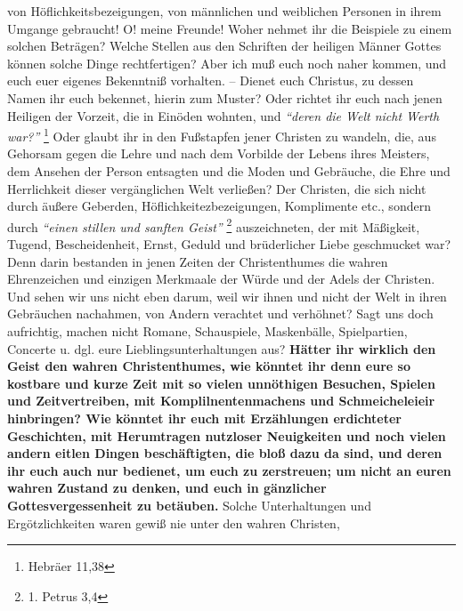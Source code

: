 von Höflichkeitsbezeigungen, von männlichen und weiblichen Personen in ihrem
Umgange gebraucht! O! meine Freunde! Woher nehmet ihr die Beispiele zu einem
solchen Beträgen? Welche Stellen aus den Schriften der heiligen Männer Gottes
können solche Dinge rechtfertigen? Aber ich muß euch noch naher kommen, und euch
euer eigenes Bekenntniß vorhalten. -- Dienet euch Christus, zu dessen Namen ihr
euch bekennet, hierin zum Muster? Oder richtet ihr euch
nach jenen Heiligen der
Vorzeit, die in Einöden wohnten, und
\textit{"`deren die Welt nicht Werth war?"'}
\footnote{Hebräer 11,38}
Oder glaubt ihr in den Fußstapfen jener Christen zu
wandeln, die, aus Gehorsam gegen die Lehre und nach dem Vorbilde der Lebens
ihres Meisters, dem Ansehen der Person entsagten und die Moden und Gebräuche,
die Ehre und Herrlichkeit dieser vergänglichen Welt verließen? Der Christen, die
sich nicht durch äußere Geberden, Höflichkeitezbezeigungen, Komplimente etc.,
sondern durch
\textit{"`einen stillen und sanften Geist"'}
\footnote{1. Petrus 3,4}
auszeichneten, der mit Mäßigkeit, Tugend,
Bescheidenheit, Ernst, Geduld und
brüderlicher Liebe geschmucket war? Denn darin bestanden in jenen Zeiten der
Christenthumes die wahren Ehrenzeichen und einzigen Merkmaale der Würde und der
Adels der Christen. Und sehen wir uns nicht eben darum, weil wir ihnen und nicht
der Welt in ihren Gebräuchen nachahmen, von Andern verachtet und verhöhnet? Sagt
uns doch aufrichtig, machen nicht Romane,
Schauspiele, Maskenbälle,
Spielpartien, Concerte u. dgl. eure
Lieblingsunterhaltungen aus? \label{ref:10_08_zeitvertreib} \textbf{Hätter ihr
wirklich den Geist den wahren Christenthumes, wie
könntet ihr denn eure so
kostbare und kurze Zeit mit so vielen unnöthigen Besuchen,
Spielen und
Zeitvertreiben, mit Komplilnentenmachens und Schmeicheleieir
hinbringen? Wie
könntet ihr euch mit Erzählungen erdichteter
Geschichten, mit Herumtragen
nutzloser Neuigkeiten und noch vielen andern eitlen
Dingen beschäftigten, die
bloß dazu da sind, und deren ihr euch auch nur bedienet, um euch zu
zerstreuen;
um nicht an euren wahren Zustand zu denken, und euch in gänzlicher
Gottesvergessenheit zu
betäuben.} Solche Unterhaltungen und Ergötzlichkeiten
waren gewiß nie unter den wahren Christen,
